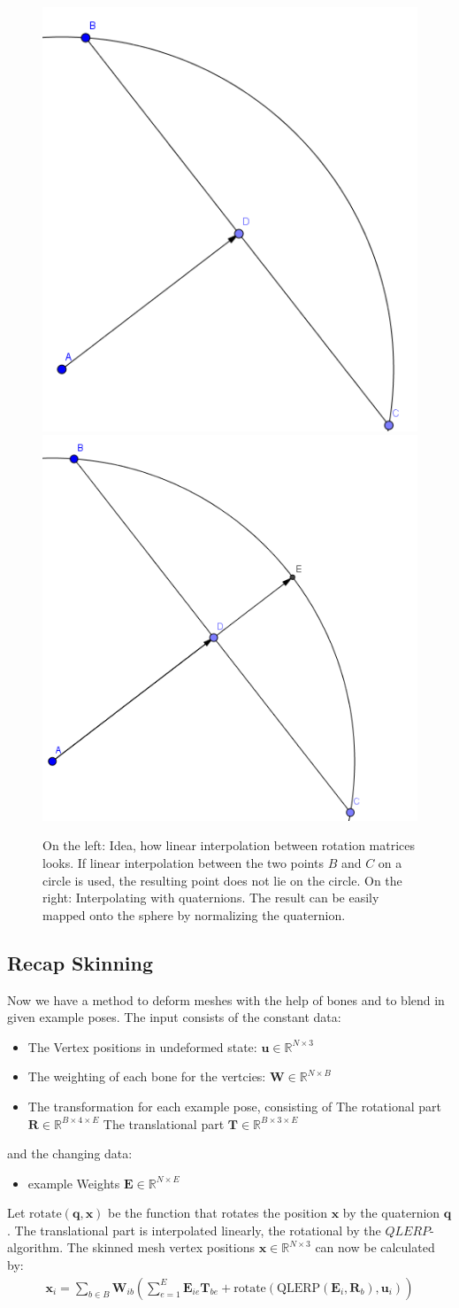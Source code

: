 \begin{figure}[tb]
	\centering
	\includegraphics[width=0.3\linewidth]{images/quatrot1} 
	\includegraphics[width=0.33\linewidth]{images/quatrot2} 
	\caption{\label{fig:image} On the left: Idea, how linear interpolation between rotation matrices looks. If linear interpolation between the two points $B$ and $C$ on a circle is used, the resulting point does not lie on the circle. On the right: Interpolating with quaternions. The result can be easily mapped onto the sphere by normalizing the quaternion.
	}
\end{figure}


\subsection{Recap Skinning}
Now we have a method to deform meshes with the help of bones and to blend in given example poses.
The input consists of the constant data:
\begin{itemize}
\item The Vertex positions in undeformed state: $\bm u\in\mathbb{R}^{N\times 3}$
\item The weighting of each bone for the vertcies: $\bm W\in\mathbb{R} ^{N \times B}$
\item The transformation for each example pose, consisting of
	\subitem The rotational part $\bm R\in\mathbb{R}^{B\times 4\times  E}$
	\subitem The translational part $\bm T\in\mathbb{R}^{B \times 3\times E}$
\end{itemize}
and the changing data:
\begin{itemize}
	\item example Weights $\bm{E}\in\mathbb{R}^{N\times E}$
\end{itemize}
Let $\text{rotate} (\bm{q},\bm{x})$ be the function that rotates the position $\bm{x}$ by the quaternion $\bm{q}$.
The translational part is interpolated linearly, the rotational by the $QLERP$-algorithm.
The skinned mesh vertex positions $\bm{x} \in \mathbb{R}^{N\times 3}$ can now be calculated by:
\begin{align}
\bm{x}_i = \sum_{b\in B} \bm{W}_{ib}\left(\sum_{e=1}^{E}\bm{E}_{ie}\bm{T}_{be} + \text{rotate}(\text{QLERP}(\bm{E}_i,\bm{R}_b),\bm{u}_i)\right)
\end{align}
